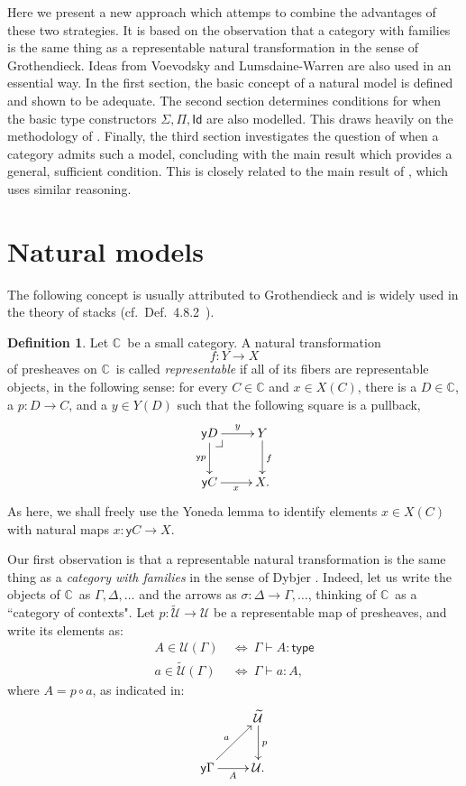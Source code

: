 \documentclass[12pt]{article}
\makeatletter
\newcommand{\C}{\ensuremath{\mathbb{C}}}
\newcommand{\pbcorner}[1][dr]{\save*!/#1-1.2pc/#1:(-1,1)@^{|-}\restore}
\newcommand{\y}{\ensuremath{\mathsf{y}}}
\newcommand{\type}{\mathsf{type}}
\newcommand{\types}[2]{#1 \vdash #2:\type}
\newcommand{\Gtypes}[1]{\types{\Gamma}{#1}}
\newcommand{\terms}[2]{#1 \vdash #2}
\newcommand{\Gterms}[1]{\terms{\Gamma}{#1}}
\newcommand{\Id}{\mathsf{Id}}
\newcommand{\U}{\ensuremath{\mathcal{U}}}
\newcommand{\UU}{\ensuremath{\widetilde{\mathcal{U}}}}
\theoremstyle{definition}
\newtheorem{definition}[theorem]{Definition}
\makeatother
\begin{document}
Here we present a new approach which attemps to combine the advantages of these two strategies. It is based on the observation that a category with families is the same thing as a representable natural transformation in the sense of Grothendieck.  Ideas from Voevodsky \cite{KLV} and Lumsdaine-Warren \cite{LW} are also used in an essential way.  In the first section, the basic concept of a natural model is defined and shown to be adequate.  The second section determines conditions for when the basic type constructors $\Sigma, \Pi, \Id$ are also modelled.  This draws heavily on the methodology of \cite{KLV}.  Finally, the third section investigates the question of when a category admits such a model, concluding with the main result which provides a general, sufficient condition. This is closely related to the main result of \cite{LW}, which uses similar reasoning.

\section{Natural models}

The following concept is usually attributed to Grothendieck and is widely used in the theory of stacks (cf.~Def.\ 4.8.2~\cite[Tag 0023]{stacks-project}).
\begin{definition}\label{def:rep}
Let \C\ be a small category.  A natural transformation $$f : Y \to X$$ of presheaves on \C\ is called \emph{representable} if all of its fibers are representable objects, in the following sense: for every $C\in\C$ and $x\in X(C)$, there is a $D\in\C$, a $p : D\to C$, and a $y\in Y(D)$ such that the following square is a pullback,
%
\begin{equation}\label{diag:rep}
\xymatrix{
 \y{D} \ar[d]_{\y{p}} \ar[r]^-{y} \pbcorner &  Y\ar[d]^{f}\\
\y{C} \ar[r]_{x}   & X .}
\end{equation}
%
As here, we shall freely use the Yoneda lemma to identify elements $x\in X(C)$ with natural maps $x:\y{C} \to X$.
\end{definition}

Our first observation is that a representable natural transformation is the same thing as a \emph{category with families} in the sense of Dybjer \cite{CwF}.  
Indeed, let us write the objects of \C\ as $\Gamma, \Delta, \ldots$ and the arrows as $\sigma : \Delta \to \Gamma, \dots$, thinking of \C\ as a ``category of contexts".  Let $p : \UU\to\U$ be a representable map of presheaves, and write its elements as:
\begin{align*}
A\in \U(\Gamma)\ &\Leftrightarrow\ \Gtypes{A}\\
a\in \UU(\Gamma)\ &\Leftrightarrow\ \Gterms{a:A},
\end{align*}
where $A=p\circ a$, as indicated in:
\[
\xymatrix{
 	&  \UU \ar[d]^{p}\\
\y\Gamma \ar[ru]^{a}   \ar[r]_{A}   & \U .}
\]
\end{document}
